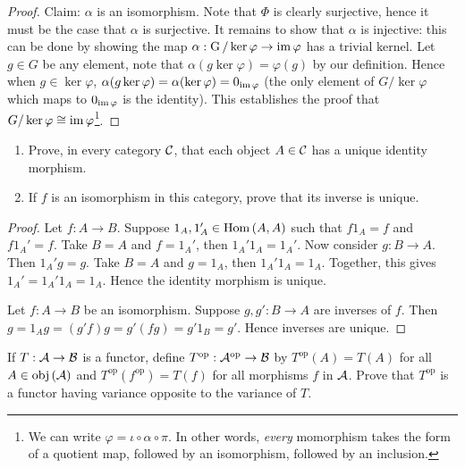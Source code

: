 {\begin{proof}
            Claim: $\alpha$ is an isomorphism. Note that $\Phi$ is clearly surjective, hence it must be the case that $\alpha$ is surjective. It remains to show that $\alpha$ is injective: this can be done by showing the map $\alpha : \operatorname{G}/\ker{\varphi} \rightarrow \operatorname{im}{\varphi}$ has a trivial kernel. Let $g \in G$ be any element, note that $\alpha(g \ker{\varphi}) = \varphi(g)$ by our definition. Hence when $g \in \ker{\varphi}$, $\alpha(g \ker{\varphi}) = \alpha(\ker{\varphi}) = 0_{\operatorname{im}{\varphi}}$ (the only element of $G/\ker{\varphi}$ which maps to $0_{\operatorname{im}{\varphi}}$ is the identity). This establishes the proof that $G/\ker{\varphi} \cong \operatorname{im}{\varphi}$\footnote{We can write $\varphi = \iota \circ \alpha \circ \pi$. In other words, \textit{every} momorphism takes the form of a quotient map, followed by an isomorphism, followed by an inclusion.}.
        \end{proof}}
    \begin{exercise}\label{ex:1-2}
        \phantom{a}
        \begin{enumerate}[label = (\roman*)]
            \item Prove, in every category $\mathcal{C}$, that each object $A \in \mathcal{C}$ has a unique identity morphism.
            \item If $f$ is an isomorphism in this category, prove that its inverse is unique.
        \end{enumerate}
    \end{exercise}
        {\color{red} \begin{proof}
            Let $f:A \rightarrow B$. Suppose $1_A,1_A' \in \operatorname{Hom}{(A,A)}$ such that $f1_A = f$ and $f1_A' = f$. Take $B=A$ and $f = 1_A'$, then $1_A' 1_A = 1_A '$. Now consider $g:B \rightarrow A$. Then  $1_A'g = g$. Take $B = A$ and $g = 1_A$, then $1_A'1_A = 1_A$. Together, this gives $1_A' = 1_A' 1_A = 1_A$. Hence the identity morphism is unique.

            Let $f:A \rightarrow B$ be an isomorphism. Suppose $g,g' : B \rightarrow A$ are inverses of $f$. Then
            $g = 1_A g = (g'f)g = g'(fg) = g'1_B = g'$. Hence inverses are unique.
        \end{proof}}

    \begin{exercise}\label{ex:1-3}
        If $T:\mathcal{A} \rightarrow \mathcal{B}$ is a functor, define $T^\text{op}: \mathcal{A}^\text{op} \rightarrow \mathcal{B}$ by $T^\text{op}(A) = T(A)$ for all $A \in \operatorname{obj}{(\mathcal{A})}$ and $T^\text{op}(f^\text{op}) = T(f)$ for all morphisms $f$ in $\mathcal{A}$. Prove that $T^\text{op}$ is a functor having variance opposite to the variance of $T$.
    \end{exercise}
    
